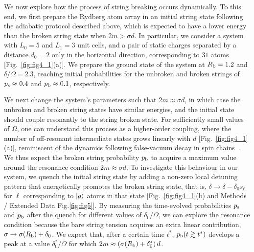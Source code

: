\documentclass[footinbib,a4paper,aps,superscriptaddress,twocolumn,preprintnumbers,amsmath,amssymb,nobalancelastpage,10pt,prl]{revtex4-2}
\begin{document}
We now explore how the process of string breaking occurs dynamically. To this end, we first prepare the Rydberg atom array in an initial string state following the adiabatic protocol described above, which is expected to have a lower energy than the broken string state when $2m > \sigma d$. In particular, we consider a system with $L_0 = 5$ and $L_1 = 3$ unit cells, and a pair of static charges separated by a distance $d_0 = 2$ only in the horizontal direction, corresponding to $31$ atoms [Fig.~\ref{fig:fig4_1}(a)]. We prepare the ground state of the system at $R_{\rm b} = 1.2$ and $\delta / \Omega = 2.3$, reaching initial probabilities for the unbroken and broken strings of $p_{\rm s} \approx 0.4$ and $p_{\rm b} \approx 0.1$, respectively. 

We next change the system's parameters such that $2m \approx \sigma d$, in which case the unbroken and broken string states have  similar energies, and the initial state should couple resonantly to the string broken state. For sufficiently small values of $\Omega$, one can understand this process as a higher-order coupling, where the number of off-resonant intermediate states grows linearly with $d$ [Fig.~\ref{fig:fig4_1}(a)], reminiscent of the dynamics following false-vacuum decay in spin chains~\cite{Lagnese_2021, Darbha_2024}. We thus expect the broken string probability $p_{\rm b}$ to acquire a maximum value around the resonance condition $2m \approx \sigma d$. To investigate this behaviour in our system, we quench the initial string state by adding a non-zero local detuning pattern that energetically promotes the broken string state, that is, $\delta \rightarrow \delta - \delta_0s_\ell$ for $\ell$ corresponding to $\ket{g}$ atoms in that state [Fig.~\ref{fig:fig4_1}(b) and Methods / Extended Data Fig.\ref{fig:fig5}]. By measuring the time-evolved probabilities $p_{\rm s}$ and $p_{\rm b}$ after the quench for different values of $\delta_0 / \Omega$, we can explore the resonance condition because the bare string tension acquires an extra linear contribution, $\sigma \rightarrow \sigma(R_{\rm b}) + \delta_0$. We expect that, after a certain time $t^*$, $p_{\rm b}(t \gtrsim t^*)$ develops a peak at a value $\delta^*_0 / \Omega$ for which $2m \approx \left(\sigma(R_{\rm b}) + \delta^*_0\right)d$.
\end{document}
